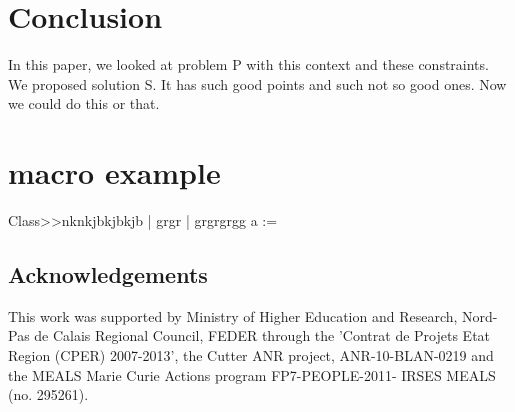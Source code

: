 \documentclass{article}
\begin{document}
\section{Conclusion}
\label{sec:conclusion}

In this paper, we looked at problem P with this context and these
constraints. We proposed solution S. It has such good points and such not so
good ones. Now we could do this or that.


\section*{macro example}

\begin{code}{}
Class>>nknkjbkjbkjb
    | grgr | 
    grgrgrgg 
    a := 
\end{code}



\subsection*{Acknowledgements} This work was supported by Ministry of Higher Education and Research, Nord-Pas de Calais Regional Council, FEDER through the 'Contrat de
Projets Etat Region (CPER) 2007-2013',  the Cutter ANR project, ANR-10-BLAN-0219 and the MEALS Marie Curie Actions program FP7-PEOPLE-2011-
IRSES MEALS (no. 295261). 

% 
% 

% 



\end{document}
